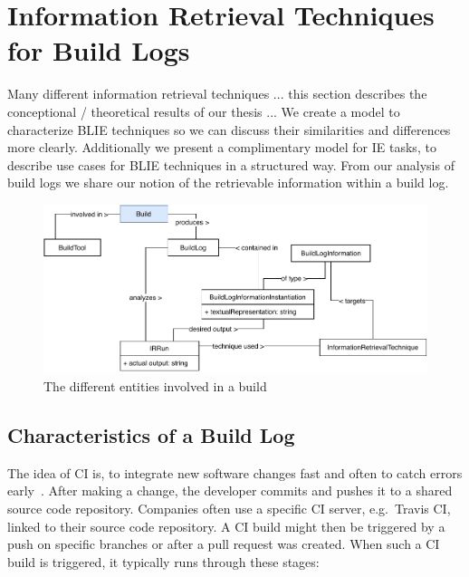 \documentclass[\myrootdir/main.tex]{subfiles}
\begin{document}
\chapter{Information Retrieval Techniques for Build Logs}
\label{sec:models}
Many different information retrieval techniques ... this section describes the conceptional / theoretical results of our thesis ...
We create a model to characterize BLIE techniques so we can discuss their similarities and differences more clearly.
Additionally we present a complimentary model for IE tasks, to describe use cases for BLIE techniques in a structured way.
From our analysis of build logs we share our notion of the retrievable information within a build log.

\begin{figure}[h]
	\centering
	\includegraphics[width=\textwidth, clip]{img/build-overview.pdf}
	\caption{The different entities involved in a build}
	\label{fig:build-overview}
\end{figure}

\section{Characteristics of a Build Log}
The idea of CI is, to integrate new software changes fast and often to catch errors early~\cite{humble2010continuous}.
After making a change, the developer commits and pushes it to a shared source code repository.
Companies often use a specific CI server, e.g.\ Travis CI, linked to their source code repository.
A CI build might then be triggered by a push on specific branches or after a pull request was created.
When such a CI build is triggered, it typically runs through these stages:
\end{document}
